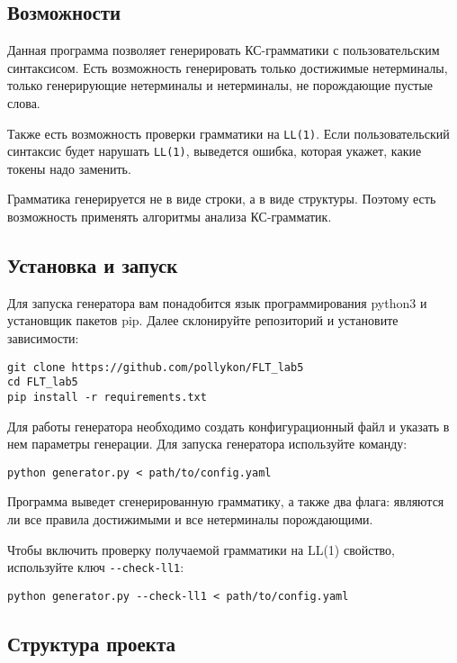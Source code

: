 \documentclass{article}
\begin{document}
\subsection{Возможности}
\qquad Данная программа позволяет генерировать КС-грамматики с пользовательским синтаксисом. Есть возможность генерировать только достижимые нетерминалы, только генерирующие нетерминалы и нетерминалы, не порождающие пустые слова.

\quad Также есть возможность проверки грамматики на \verb|LL(1)|. Если пользовательский синтаксис будет нарушать \verb|LL(1)|, выведется ошибка, которая укажет, какие токены надо заменить.

\quad Грамматика генерируется не в виде строки, а в виде  структуры. Поэтому есть возможность применять алгоритмы анализа КС-грамматик.

\subsection{Установка и запуск}
\qquad Для запуска генератора вам понадобится язык программирования python3 и установщик пакетов pip. Далее склонируйте репозиторий и установите зависимости:

\begin{lstlisting}
git clone https://github.com/pollykon/FLT_lab5
cd FLT_lab5
pip install -r requirements.txt
\end{lstlisting}

\qquad Для работы генератора необходимо создать конфигурационный файл и указать в нем параметры генерации. Для запуска генератора используйте команду:

\begin{lstlisting}
python generator.py < path/to/config.yaml
\end{lstlisting}

\qquad Программа выведет сгенерированную грамматику, а также два флага: являются ли все правила достижимыми и все нетерминалы порождающими.

\qquad Чтобы включить проверку получаемой грамматики на LL(1) свойство, используйте ключ \verb|--check-ll1|:

\begin{lstlisting}
python generator.py --check-ll1 < path/to/config.yaml
\end{lstlisting}

\subsection{Структура проекта}
\end{document}
